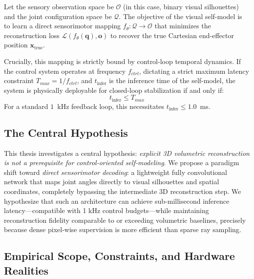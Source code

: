 \documentclass[12pt,a4paper,oneside]{report}
\begin{document}
Let the sensory observation space be $\mathcal{O}$ (in this case, binary visual silhouettes) and the joint configuration space be $\mathcal{Q}$. The objective of the visual self-model is to learn a direct sensorimotor mapping $f_\theta: \mathcal{Q} \rightarrow \mathcal{O}$ that minimizes the reconstruction loss $\mathcal{L}(f_\theta(\mathbf{q}), \mathbf{o})$ to recover the true Cartesian end-effector position $\mathbf{x}_{\text{true}}$. 

Crucially, this mapping is strictly bound by control-loop temporal dynamics. If the control system operates at frequency $f_{ctrl}$, dictating a strict maximum latency constraint $T_{max} = 1/f_{ctrl}$, and $t_{\text{infer}}$ is the inference time of the self-model, the system is physically deployable for closed-loop stabilization if and only if:
\begin{equation}
t_{\text{infer}} \le T_{max}
\end{equation}
For a standard $1$~kHz feedback loop, this necessitates $t_{\text{infer}} \le 1.0$~ms.

\subsection{The Central Hypothesis}
\label{subsec:central_hypothesis_intro}

This thesis investigates a central hypothesis: \textit{explicit 3D volumetric reconstruction is not a prerequisite for control-oriented self-modeling}. We propose a paradigm shift toward \textit{direct sensorimotor decoding}: a lightweight fully convolutional network that maps joint angles directly to visual silhouettes and spatial coordinates, completely bypassing the intermediate 3D reconstruction step. We hypothesize that such an architecture can achieve sub-millisecond inference latency---compatible with 1 kHz control budgets---while maintaining reconstruction fidelity comparable to or exceeding volumetric baselines, precisely because dense pixel-wise supervision is more efficient than sparse ray sampling.

\subsection{Empirical Scope, Constraints, and Hardware Realities}
\label{subsec:empirical_scope_intro}
\end{document}
